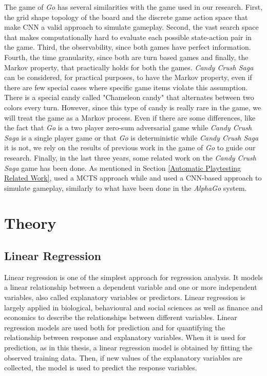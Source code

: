The game of \textit{Go} has several similarities with the game used in our research. First, the grid shape topology of the board and the discrete game action space that make \acs{CNN} a valid approach to simulate gameplay. Second, the vast search space that makes computationally hard to evaluate each possible state-action pair in the game. Third, the observability, since both games have perfect information. Fourth, the time granularity, since both are turn based games and finally, the Markov property, that practically holds for both the games. \textit{Candy Crush Saga} can be considered, for practical purposes, to have the Markov property, even if there are few special cases where specific game items violate this assumption. There is a special candy called "Chameleon candy" that alternates between two colors every turn. However, since this type of candy is really rare in the game, we will treat the game as a Markov process. Even if there are some differences, like the fact that \textit{Go} is a two player zero-sum adversarial game while \textit{Candy Crush Saga} is a single player game or that \textit{Go} is deterministic while \textit{Candy Crush Saga} it is not, we rely on the results of previous work in the game of \textit{Go} to guide our research. Finally, in the last three years, some related work on the \textit{Candy Crush Saga} game has been done. As mentioned in Section \ref{Automatic Playtesting Related Work},  \textcite{poromaa_crushing_2017} used a \acs{MCTS} approach while \textcite{eisen_simulating_2017} and \textcite{purmonen_predicting_2017} used a \acs{CNN}-based approach to simulate gameplay, similarly to what have been done in the \textit{AlphaGo} system.

\section{Theory}

\subsection{Linear Regression}

Linear regression is one of the simplest approach for regression analysis. It models a linear relationship between a dependent variable and one or more independent variables, also called explanatory variables or predictors. Linear regression is largely applied in biological, behavioural and social sciences as well as finance and economics to describe the relationships between different variables. Linear regression models are used both for prediction and for quantifying the relationship between response and explanatory variables. When it is used for prediction, as in this thesis, a linear regression model is obtained by fitting the observed training data. Then, if new values of the explanatory variables are collected, the model is used to predict the response variables.

